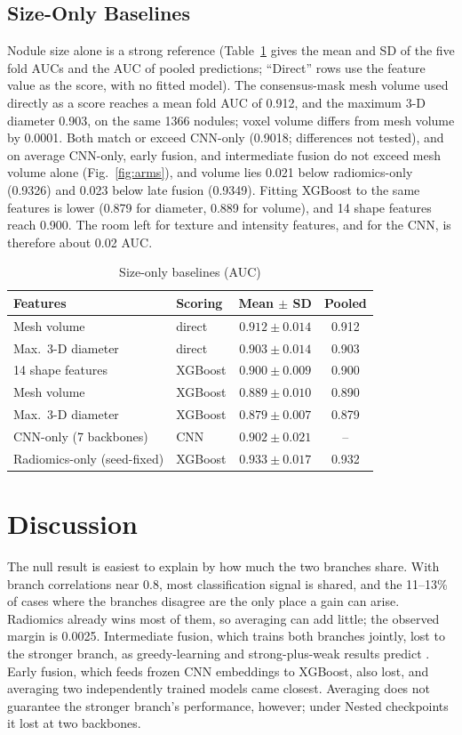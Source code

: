 \documentclass[conference]{IEEEtran}
\begin{document}
\subsection{Size-Only Baselines}\label{sec:size}
Nodule size alone is a strong reference (Table~\ref{tab:size} gives the mean and SD of the five fold AUCs and the AUC of pooled predictions; ``Direct'' rows use the feature value as the score, with no fitted model). The consensus-mask mesh volume used directly as a score reaches a mean fold AUC of 0.912, and the maximum 3-D diameter 0.903, on the same 1366 nodules; voxel volume differs from mesh volume by 0.0001. Both match or exceed CNN-only (0.9018; differences not tested), and on average CNN-only, early fusion, and intermediate fusion do not exceed mesh volume alone (Fig.~\ref{fig:arms}), and volume lies 0.021 below radiomics-only (0.9326) and 0.023 below late fusion (0.9349). Fitting XGBoost to the same features is lower (0.879 for diameter, 0.889 for volume), and 14 shape features reach 0.900. The room left for texture and intensity features, and for the CNN, is therefore about 0.02 AUC.

\begin{table}[t]
\caption{Size-only baselines (AUC)}
\label{tab:size}
\centering
\footnotesize
\begin{tabular}{@{}llcc@{}}
\toprule
Features & Scoring & Mean $\pm$ SD & Pooled \\
\midrule
Mesh volume & direct & $0.912\pm0.014$ & 0.912 \\
Max.\ 3-D diameter & direct & $0.903\pm0.014$ & 0.903 \\
14 shape features & XGBoost & $0.900\pm0.009$ & 0.900 \\
Mesh volume & XGBoost & $0.889\pm0.010$ & 0.890 \\
Max.\ 3-D diameter & XGBoost & $0.879\pm0.007$ & 0.879 \\
\midrule
CNN-only (7 backbones) & CNN & $0.902\pm0.021$ & -- \\
Radiomics-only (seed-fixed) & XGBoost & $0.933\pm0.017$ & 0.932 \\
\bottomrule
\end{tabular}
\end{table}

\section{Discussion}\label{sec:discussion}

The null result is easiest to explain by how much the two branches share. With branch correlations near 0.8, most classification signal is shared, and the 11--13\% of cases where the branches disagree are the only place a gain can arise. Radiomics already wins most of them, so averaging can add little; the observed margin is 0.0025. Intermediate fusion, which trains both branches jointly, lost to the stronger branch, as greedy-learning and strong-plus-weak results predict \cite{wu_greedy_2022,chang_synergy_2025}. Early fusion, which feeds frozen CNN embeddings to XGBoost, also lost, and averaging two independently trained models came closest. Averaging does not guarantee the stronger branch's performance, however; under Nested checkpoints it lost at two backbones.
\end{document}
